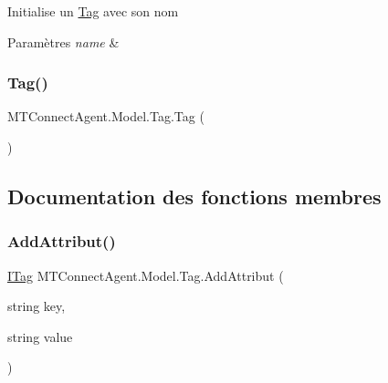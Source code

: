 Initialise un \mbox{\hyperlink{class_m_t_connect_agent_1_1_model_1_1_tag}{Tag}} avec son nom 


\begin{DoxyParams}{Paramètres}
{\em name} & \\
\hline
\end{DoxyParams}
\mbox{\label{class_m_t_connect_agent_1_1_model_1_1_tag_afd32a03ff27dadb13432b288e3cee54f}} 
\subsubsection{\texorpdfstring{Tag()}{Tag()}\hspace{0.1cm}{\footnotesize\ttfamily [3/3]}}
{\footnotesize\ttfamily M\+T\+Connect\+Agent.\+Model.\+Tag.\+Tag (\begin{DoxyParamCaption}{ }\end{DoxyParamCaption})\hspace{0.3cm}{\ttfamily [inline]}}



\subsection{Documentation des fonctions membres}
\mbox{\label{class_m_t_connect_agent_1_1_model_1_1_tag_ad39fa56fac8573b45c5d987288928e31}} 
\subsubsection{\texorpdfstring{Add\+Attribut()}{AddAttribut()}}
{\footnotesize\ttfamily \mbox{\hyperlink{interface_m_t_connect_agent_1_1_model_1_1_i_tag}{I\+Tag}} M\+T\+Connect\+Agent.\+Model.\+Tag.\+Add\+Attribut (\begin{DoxyParamCaption}\item[{string}]{key,  }\item[{string}]{value }\end{DoxyParamCaption})\hspace{0.3cm}{\ttfamily [inline]}}



